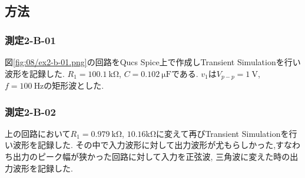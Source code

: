 \subsection{方法}
\subsubsection{測定2-B-01}
図\ref{fig:08/ex2-b-01.png}の回路をQucs Spice上で作成しTransient Simulationを行い波形を記録した.
$R_1=100.1\ \si{\kilo\ohm}$, $C=0.102\ \si{\micro\farad}$である.
$v_1$は$V_{p-p}=1\ \si{\volt}$, $f=100\ \si{\hertz}$の矩形波とした.
\subsubsection{測定2-B-02}
上の回路において$R_1=0.979\ \si{\kilo\ohm}$, $10.16\si{\kilo\ohm}$に変えて再びTransient Simulationを行い波形を記録した.
その中で入力波形に対して出力波形が尤もらしかった,すなわち出力のピーク幅が狭かった回路に対して入力を正弦波,
三角波に変えた時の出力波形を記録した.